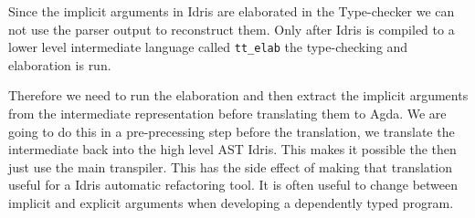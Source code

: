 Since the implicit arguments in Idris are elaborated in the Type-checker we can
not use the parser output to reconstruct them.
Only after Idris is compiled to a lower level intermediate
language called \texttt{tt\_elab} the type-checking and elaboration is
run.

Therefore we need to run the elaboration and then extract the implicit
arguments from the intermediate representation before translating them to
Agda.  We are going to do this in a pre-precessing step before the translation,
we translate the intermediate back into the high level AST Idris. This makes it
possible the then just use the main transpiler.  This has the side effect of
making that translation useful for a Idris automatic refactoring tool. It is
often useful to change between implicit and explicit arguments when developing
a dependently typed program.





